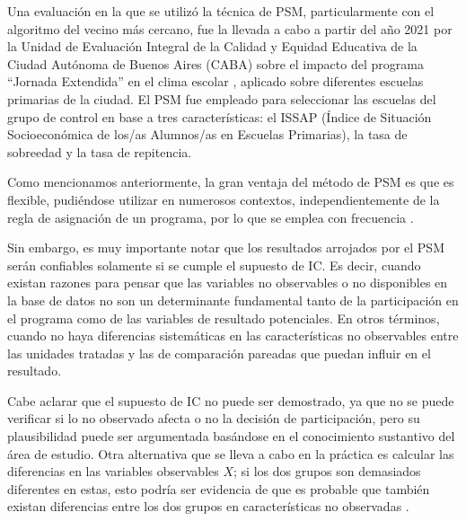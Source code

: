 \documentclass[../../main.tex]{subfiles}
\begin{document}

Una evaluación en la que se utilizó la técnica de PSM, particularmente con el algoritmo
del vecino más cercano, fue la llevada a cabo a partir del año 2021 por la Unidad de
Evaluación Integral de la Calidad y Equidad Educativa de la Ciudad Autónoma de Buenos
Aires (CABA) sobre el impacto del programa ``Jornada Extendida'' en el clima escolar
\cite{ueicee2023jornada}, aplicado sobre diferentes escuelas primarias de la ciudad. El
PSM fue empleado para seleccionar las escuelas del grupo de control en base a tres
características: el ISSAP (Índice de Situación Socioeconómica de los/as Alumnos/as en
Escuelas Primarias), la tasa de sobreedad y la tasa de repitencia.

Como mencionamos anteriormente, la gran ventaja del método de PSM es que es flexible,
pudiéndose utilizar en numerosos contextos, independientemente de la regla de asignación
de un programa, por lo que se emplea con frecuencia \cite{bernal}.

Sin embargo, es muy importante notar que los resultados arrojados por el PSM serán
confiables solamente si se cumple el supuesto de IC. Es decir, cuando existan razones para
pensar que las variables no observables o no disponibles en la base de datos no son un
determinante fundamental tanto de la participación en el programa como de las variables de
resultado potenciales. En otros términos, cuando no haya diferencias sistemáticas en las
características no observables entre las unidades tratadas y las de comparación pareadas
que puedan influir en el resultado.

Cabe aclarar que el supuesto de IC no puede ser demostrado, ya que no se puede verificar
si lo no observado afecta o no la decisión de participación, pero su plausibilidad puede
ser argumentada basándose en el conocimiento sustantivo del área de estudio. Otra
alternativa que se lleva a cabo en la práctica es calcular las diferencias en las
variables observables \(X\); si los dos grupos son demasiados diferentes en estas, esto
podría ser evidencia de que es probable que también existan diferencias entre los dos
grupos en características no observadas \cite{bernal}.
\end{document}
